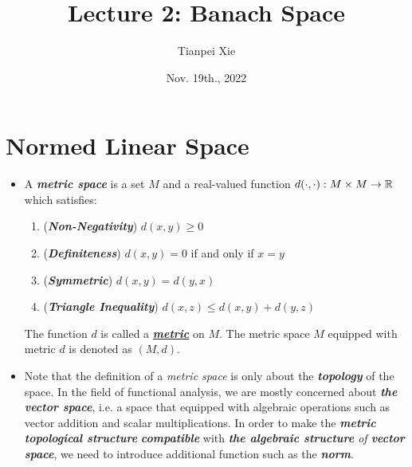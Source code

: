 \documentclass[11pt]{article}
\begin{document}
\title{Lecture 2: Banach Space}
\author{ Tianpei Xie}
\date{ Nov. 19th., 2022 }
\maketitle
\tableofcontents
\newpage
\section{Normed Linear Space}
\begin{itemize}
\item \begin{definition}
A \emph{\textbf{metric space}} is a set $M$ and a real-valued function $d(\cdot , \cdot): M \times M \rightarrow {\mathbb R}$  which satisfies:
\begin{enumerate}
\item (\emph{\textbf{Non-Negativity}}) $d(x, y) \ge 0$
\item (\emph{\textbf{Definiteness}}) $d(x, y) = 0$ if and only if $x = y$
\item (\emph{\textbf{Symmetric}}) $d(x, y) = d(y, x)$
\item (\emph{\textbf{Triangle Inequality}}) $d(x, z) \le d(x, y) + d(y, z)$
\end{enumerate} The function $d$ is called a \underline{\emph{\textbf{metric}}} on $M$. The metric space $M$ equipped with metric $d$ is denoted as $(M, d)$.
\end{definition}

\item \begin{remark}
Note that the definition of a \emph{metric space} is only about the \emph{\textbf{topology}} of the space. In the field of functional analysis,  we are mostly concerned about \emph{\textbf{the vector space}}, i.e. a space that equipped with algebraic operations such as vector addition and  scalar multiplications. In order to make the \emph{\textbf{metric}\textbf{ topological structure}} \emph{\textbf{compatible}} with \emph{\textbf{the algebraic structure} of \textbf{vector space}}, we need to introduce additional function such as the \emph{\textbf{norm}}.
\end{remark}


\end{itemize}
\end{document}
